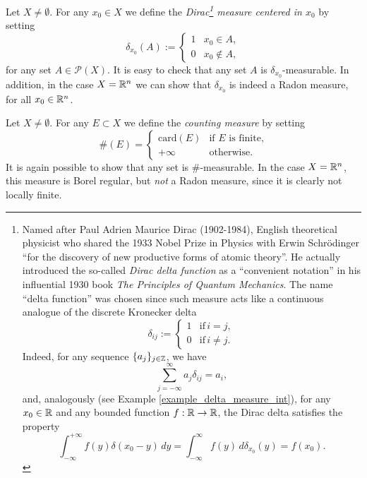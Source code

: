 \begin{example} \label{example_delta_measure}
Let $X \neq \emptyset$. For any $x_{0} \in X$ we define the \emph{Dirac\footnote{Named after Paul Adrien Maurice Dirac (1902-1984), English theoretical physicist who shared the 1933 Nobel Prize in Physics with Erwin Schrödinger ``for the discovery of new productive forms of atomic theory''. He actually introduced the so-called {\em Dirac delta function} as a ``convenient notation'' in his influential 1930 book {\em The Principles of Quantum Mechanics}. The name ``delta function'' was chosen since such measure acts like a continuous analogue of the discrete Kronecker delta 
\[
\delta_{i j} := 
\begin{cases}
1 & \text{if} \, i = j,
\\
0 & \text{if} \, i \neq j.
\end{cases}
\]
Indeed, for any sequence $\{a_{j}\}_{j \in \mathbb{Z}}$, we have
\begin{equation*}
\sum_{j = -\infty}^{\infty} a_{j} \delta_{i j} = a_{i},
\end{equation*}
and, analogously (see Example \ref{example_delta_measure_int}), for any $x_{0} \in \mathbb{R}$ and any bounded function $f : \mathbb{R} \to \mathbb{R}$, the Dirac delta satisfies the property
\begin{equation*}
\int_{- \infty}^{+ \infty} f(y) \delta(x_{0} - y) \, dy = \int_{- \infty}^{\infty} f(y)\, d \delta_{x_{0}}(y) = f(x_{0}).
\end{equation*}
} measure centered in $x_{0}$} by setting
\[
\delta_{x_{0}}(A) := 
\begin{cases}
1 & x_{0} \in A,
\\
0 & x_{0} \not\in A,
\end{cases}
\]
for any set $A \in \mathcal{P}(X)$. It is easy to check that any set $A$ is $\delta_{x_{0}}$-measurable. In addition, in the case $X = \mathbb{R}^{n}$ we can show that $\delta_{x_{0}}$ is indeed a Radon measure, for all $x_{0} \in \mathbb{R}^{n}$.
\end{example}

\begin{example} 
Let $X \neq \emptyset$. For any $E \subset X$ we define the \emph{counting measure} by setting
\[
\# (E) = 
\begin{cases}
\text{card}(E) & \text{if $E$ is finite,}
\\
+\infty & \text{otherwise}.
\end{cases}
\]
It is again possible to show that any set is $\#$-measurable.
In the case $X = \mathbb{R}^{n}$, this measure is Borel regular, but \emph{not} a Radon measure, since it is
clearly not locally finite.
\end{example}

